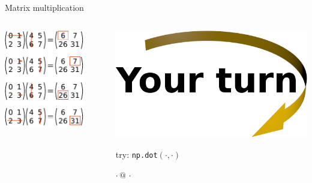 \documentclass[svgnames]{beamer}
\begin{document}
\begin{frame}{Matrix multiplication}
 \begin{columns}
  \begin{column}{0.6\textwidth}
   \begin{center}
    \includegraphics[width=0.8\textwidth]{matrixmult}
   \end{center}
  \end{column}%
  \begin{column}{0.4\textwidth}
   \includegraphics[width=3truecm]{yourturn}

   \vspace{0.4truecm}
   try: \texttt{np.dot$(\cdot, \cdot)$}\\
   \strut\hphantom{try:\ } \texttt{$\cdot\,@\,\cdot$}
  \end{column}
 \end{columns}
\end{frame}
\end{document}
